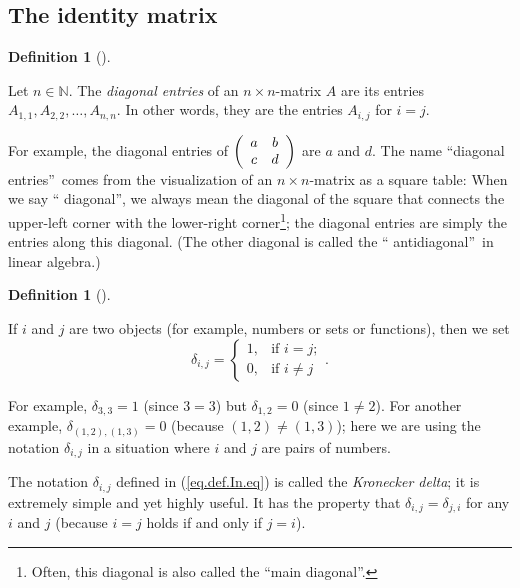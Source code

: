 \documentclass[numbers=enddot,12pt,final,onecolumn,notitlepage]{scrartcl}%
\theoremstyle{definition}
\newtheorem{defi}[theo]{Definition}
\newenvironment{definition}[1][]
{\begin{defi}[#1]\begin{leftbar}}
{\end{leftbar}\end{defi}}
\begin{document}
\subsection{The identity matrix}

\begin{definition}
Let $n\in\mathbb{N}$. The \textit{diagonal entries} of an $n\times n$-matrix
$A$ are its entries $A_{1,1},A_{2,2},\ldots,A_{n,n}$. In other words, they are
the entries $A_{i,j}$ for $i=j$.
\end{definition}

For example, the diagonal entries of $\left(
\begin{array}
[c]{cc}%
a & b\\
c & d
\end{array}
\right)  $ are $a$ and $d$. The name \textquotedblleft diagonal
entries\textquotedblright\ comes from the visualization of an $n\times
n$-matrix as a square table: When we say \textquotedblleft
diagonal\textquotedblright, we always mean the diagonal of the square that
connects the upper-left corner with the lower-right corner\footnote{Often,
this diagonal is also called the \textquotedblleft main
diagonal\textquotedblright.}; the diagonal entries are simply the entries
along this diagonal. (The other diagonal is called the \textquotedblleft
antidiagonal\textquotedblright\ in linear algebra.)

\begin{definition}
If $i$ and $j$ are two objects (for example, numbers or sets or functions),
then we set%
\begin{equation}
\delta_{i,j}=%
\begin{cases}
1, & \text{if }i=j;\\
0, & \text{if }i\neq j
\end{cases}
. \label{eq.def.In.eq}%
\end{equation}

\end{definition}

For example, $\delta_{3,3}=1$ (since $3=3$) but $\delta_{1,2}=0$ (since
$1\neq2$). For another example, $\delta_{\left(  1,2\right)  ,\left(
1,3\right)  }=0$ (because $\left(  1,2\right)  \neq\left(  1,3\right)  $);
here we are using the notation $\delta_{i,j}$ in a situation where $i$ and $j$
are pairs of numbers.

The notation $\delta_{i,j}$ defined in (\ref{eq.def.In.eq}) is called the
\textit{Kronecker delta}; it is extremely simple and yet highly useful. It has
the property that $\delta_{i,j}=\delta_{j,i}$ for any $i$ and $j$ (because
$i=j$ holds if and only if $j=i$).
\end{document}
